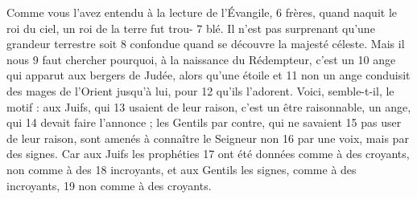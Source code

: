 Comme vous l'avez entendu à la lecture de l'Évangile,	 
6	 	frères, quand naquit le roi du ciel, un roi de la terre fut trou-	 
7	 	blé. Il n'est pas surprenant qu'une grandeur terrestre soit	 
8	 	confondue quand se découvre la majesté céleste. Mais il nous	 
9	 	faut chercher pourquoi, à la naissance du Rédempteur, c'est un	 
10	 	ange qui apparut aux bergers de Judée, alors qu'une étoile et	 
11	 	non un ange conduisit des mages de l'Orient jusqu'à lui, pour	 
12	 	qu'ils l'adorent. Voici, semble-t-il, le motif : aux Juifs, qui	 
13	 	usaient de leur raison, c'est un être raisonnable, un ange, qui	 
14	 	devait faire l'annonce ; les Gentils par contre, qui ne savaient	 
15	 	pas user de leur raison, sont amenés à connaître le Seigneur non	 
16	 	par une voix, mais par des signes. Car aux Juifs les prophéties	 
17	 	ont été données comme à des croyants, non comme à des	 
18	 	incroyants, et aux Gentils les signes, comme à des incroyants,	 
19	 	non comme à des croyants.